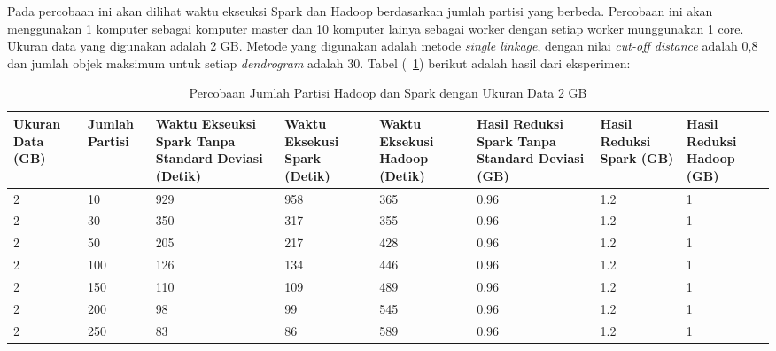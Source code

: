 Pada percobaan ini akan dilihat waktu ekseuksi Spark dan Hadoop berdasarkan jumlah partisi yang berbeda. Percobaan ini akan menggunakan 1 komputer sebagai komputer master dan 10 komputer lainya sebagai worker dengan setiap worker munggunakan 1 core. Ukuran data yang digunakan adalah 2 GB. Metode yang digunakan adalah metode \textit{single linkage}, dengan nilai \textit{cut-off distance} adalah 0,8 dan jumlah objek maksimum untuk setiap \textit{dendrogram} adalah 30. Tabel (~\ref{tab:spark2}) berikut adalah hasil dari eksperimen:

\begin{table}[H] 
	\centering 
	\caption{Percobaan Jumlah Partisi Hadoop dan Spark dengan Ukuran Data 2 GB}
	\label{tab:spark2}
	\begin{tabular}{|p{1.1cm}|p{1.1cm}|p{2.5cm}|p{2.5cm}|p{2.5cm}|p{2cm}|p{1.5cm}|p{1.5cm}|}
\hline
Ukuran Data (GB) & Jumlah Partisi &  Waktu Ekseuksi Spark Tanpa Standard Deviasi (Detik) & Waktu Eksekusi Spark (Detik) & Waktu Eksekusi Hadoop (Detik) & Hasil Reduksi Spark Tanpa Standard Deviasi (GB) & Hasil Reduksi Spark (GB)  & Hasil Reduksi Hadoop (GB)\\ 
\hline
2 & 10 & 929  & 958  & 365  & 0.96 & 1.2 & 1 \\
\hline
2 & 30 & 350  & 317  & 355  & 0.96 & 1.2 & 1 \\
\hline
2 & 50 & 205  & 217  & 428  & 0.96 & 1.2 & 1 \\
\hline
2 & 100 & 126  & 134  & 446  & 0.96 & 1.2 & 1 \\
\hline
2 & 150 & 110  & 109  & 489  & 0.96 & 1.2 & 1 \\
\hline
2 & 200 & 98  & 99  & 545  & 0.96 & 1.2 & 1 \\
\hline
2 & 250 & 83  & 86  & 589  & 0.96 & 1.2 & 1 \\
\hline

\hline

	\end{tabular} 
\end{table}



\def\scl{1}

\def\leg{} 
\def\std{none}
\def\ymin{}
\def\ymax{}

